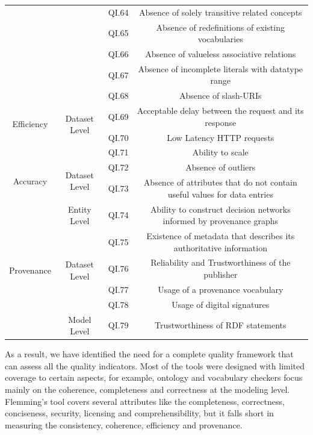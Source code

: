 \documentclass[onecolumn, crcready]{iosart2c}
\begin{document}
\begin{landscape}
\begin{center}
{\begin{longtable}[h]{|c|c|c|c|}
\cline{3-4}
 &  & QI.64 & Absence of solely transitive related concepts \cite{Mader2012}\tabularnewline
\cline{3-4}
 &  & QI.65 & Absence of redefinitions of existing vocabularies  \cite{Hogan2010}\tabularnewline
\cline{3-4}
 &  & QI.66 & Absence of valueless associative relations  \cite{Mader2012}\tabularnewline
\cline{3-4}
 &  & QI.67 & Absence of incomplete literals with datatype range \cite{Hogan2010}\tabularnewline
\hline
\hline
\multirow{4}{*}{Efficiency} & \multirow{4}{*}{Dataset Level} & QI.68 & Absence of slash-URIs \cite{Framework2012}\tabularnewline
\cline{3-4}
 &  & QI.69 & Acceptable delay between the request and its response \cite{citeulike:2925559}\tabularnewline
\cline{3-4}
 &  & QI.70 & Low Latency HTTP requests \cite{Framework2012}\tabularnewline
\cline{3-4}
 &  & QI.71 & Ability to scale \cite{Framework2012}\tabularnewline
\hline
\hline
\multirow{2}{*}{Accuracy} & \multirow{2}{*}{Dataset Level} & QI.72 & Absence of outliers \cite{Framework2012}\tabularnewline
\cline{3-4}
 &  & QI.73 & Absence of attributes that do not contain useful values for data entries \cite{Framework2012}\tabularnewline
\hline
\hline
\multirow{6}{*}{Provenance} & \multirow{1}{*}{Entity Level} & QI.74 & Ability to construct decision networks informed by provenance graphs \cite{Gamble2011}\tabularnewline
\cline{2-4}
 & \multirow{4}{*}{Dataset Level} & QI.75 & Existence of metadata that describes its authoritative information  \cite{Flouris2012}\tabularnewline
\cline{3-4}
 &  & QI.76 & Reliability and Trustworthiness of the publisher \cite{Flouris2012}\tabularnewline
\cline{3-4}
 &  & QI.77 & Usage of a provenance vocabulary\tabularnewline
\cline{3-4}
 &  & QI.78 & Usage of digital signatures \cite{Framework2012}\tabularnewline
\cline{2-4}
 & \multirow{1}{*}{Model Level} & QI.79 & Trustworthiness of RDF statements \cite{Hartig09usingweb}\tabularnewline
\hline
\end{longtable}
}
\end{center}
\end{landscape}


As a result, we have identified the need for a complete quality framework that can assess all the quality indicators. Most of the tools were designed with limited coverage to certain aspects, for example, ontology and vocabulary checkers focus mainly on the coherence, completeness and correctness at the modeling level. Flemming's tool covers several attributes like the completeness, correctness, conciseness, security, licensing and comprehensibility, but it falls short in measuring the consistency, coherence, efficiency and provenance.\\
\end{document}
